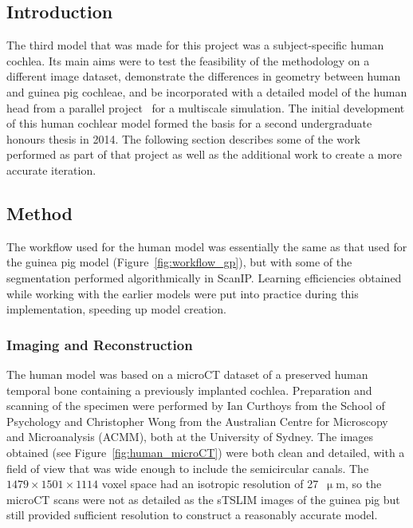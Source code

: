 \subsection{Introduction}

The third model that was made for this project was a subject-specific human
cochlea. Its main aims were to test the feasibility of the methodology on a
different image dataset, demonstrate the differences in geometry between human
and guinea pig cochleae, and be incorporated with a detailed model of the human
head from a parallel project~\cite{tran2015} for a multiscale simulation. The
initial development of this human cochlear model formed the basis for a second
undergraduate honours thesis in 2014. The following section describes some of
the work performed as part of that project as well as the additional work to
create a more accurate iteration.

\subsection{Method}

The workflow used for the human model was essentially the same as that used for
the guinea pig model (Figure~\ref{fig:workflow_gp}), but with some of the
segmentation performed algorithmically in ScanIP. Learning efficiencies obtained
while working with the earlier models were put into practice during this
implementation, speeding up model creation.

\subsubsection{Imaging and Reconstruction}

The human model was based on a microCT dataset of a preserved human temporal
bone containing a previously implanted cochlea. Preparation and scanning of the
specimen were performed by Ian Curthoys from the School of Psychology and
Christopher Wong from the Australian Centre for Microscopy and Microanalysis
(ACMM), both at the University of Sydney. The images obtained (see
Figure~\ref{fig:human_microCT}) were both clean and detailed, with a field of
view that was wide enough to include the semicircular canals. The $ 1479 \times
1501 \times 1114 $ voxel space had an isotropic resolution of 27~$ \upmu $m, so
the microCT scans were not as detailed as the sTSLIM images of the guinea pig
but still provided sufficient resolution to construct a reasonably accurate
model.

